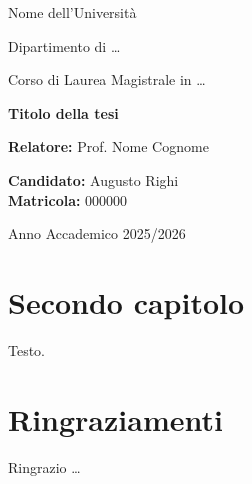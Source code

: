 \documentclass[12pt,a4paper]{report}
\begin{document}
\begin{titlepage}
  \centering
  {\Large Nome dell'Università\par}
  {\large Dipartimento di \dots\par}
  {\large Corso di Laurea Magistrale in \dots\par}

  \vspace{4cm}
  {\Huge\bfseries Titolo della tesi\par}

  \vfill
  \begin{flushleft}
    \textbf{Relatore:} Prof. Nome Cognome
  \end{flushleft}
  \begin{flushright}
    \textbf{Candidato:} Augusto Righi\\
    \textbf{Matricola:} 000000
  \end{flushright}

  \vspace{1cm}
  Anno Accademico 2025/2026
\end{titlepage}

\tableofcontents %
\clearpage


\listoffigures %
\clearpage



\chapter{Secondo capitolo}
Testo.

\clearpage
{}

\nocite{*}  %


\clearpage
\chapter*{Ringraziamenti}
Ringrazio \dots
\end{document}

